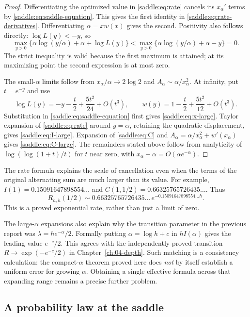 \begin{proof}
Differentiating the optimized value in \eqref{saddle:eq:rate} cancels its
$x_\alpha'$ terms by \eqref{saddle:eq:saddle-equation}. This gives the first
identity in \eqref{saddle:eq:rate-derivatives}. Differentiating
$\alpha=xw(x)$ gives the second. Positivity also follows directly:
$\log L(y)<-y$, so
\[
 \max_{y>0}\{\alpha\log(y/\alpha)+\alpha+\log L(y)\}
 <\max_{y>0}\{\alpha\log(y/\alpha)+\alpha-y\}=0.
\]
The strict inequality is valid because the first maximum is attained;
at its maximizing point the second expression is at most zero.

The small-$\alpha$ limits follow from
$x_\alpha/\alpha\to2\log2$ and
$A_\alpha\sim\alpha/x_\alpha^2$. At infinity, put $t=e^{-y}$ and use
\[
 \log L(y)=-y-\frac t2+\frac{5t^2}{24}+O(t^3),
 \qquad
 w(y)=1-\frac t2+\frac{5t^2}{12}+O(t^3).
\]
Substitution in \eqref{saddle:eq:saddle-equation} first gives
\eqref{saddle:eq:x-large}. Taylor expansion of \eqref{saddle:eq:rate} around
$y=\alpha$, retaining the quadratic displacement, gives
\eqref{saddle:eq:I-large}. Expansion of \eqref{saddle:eq:C} and
$A_\alpha=\alpha/x_\alpha^2+w'(x_\alpha)$ gives
\eqref{saddle:eq:C-large}. The remainders stated above follow from analyticity
of $\log(\log(1+t)/t)$ for $t$ near zero, with
$x_\alpha-\alpha=O(\alpha e^{-\alpha})$.
\end{proof}

The rate formula explains the scale of cancellation even when the terms
of the original alternating sum are much larger than its value. For
example, $I(1)=0.15091647898554\ldots$ and
$C(1,1/2)=0.66325765726435\ldots$. Thus
\[
 R_{h,h}(1/2)\sim0.66325765726435\ldots\,
 e^{-0.15091647898554\ldots h}.
\]
This is a proved exponential rate, rather than just a limit of zero.

The large-$\alpha$ expansions also explain why the transition parameter
in the previous report was $\lambda=he^{-\alpha}/2$. Formally putting
$\alpha=\log h+c$ in $hI(\alpha)$ gives the leading value
$e^{-c}/2$. This agrees with the independently proved transition
$R\to\exp(-e^{-c}/2)$ in Chapter~\ref{ch:04-depth}. Such matching is a
consistency calculation: the compact-$\alpha$ theorem proved here does
\emph{not} by itself establish a uniform error for growing $\alpha$.
Obtaining a single effective formula across that expanding range
remains a precise further problem.

\subsection{A probability law at the saddle}

